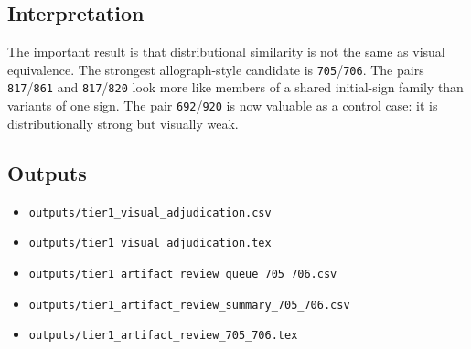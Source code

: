 \subsection{Interpretation}

The important result is that distributional similarity is not the same as visual equivalence. The strongest allograph-style candidate is \texttt{705}/\texttt{706}. The pairs \texttt{817}/\texttt{861} and \texttt{817}/\texttt{820} look more like members of a shared initial-sign family than variants of one sign. The pair \texttt{692}/\texttt{920} is now valuable as a control case: it is distributionally strong but visually weak.

\subsection{Outputs}

\begin{itemize}
  \item \texttt{outputs/tier1\_visual\_adjudication.csv}
  \item \texttt{outputs/tier1\_visual\_adjudication.tex}
  \item \texttt{outputs/tier1\_artifact\_review\_queue\_705\_706.csv}
  \item \texttt{outputs/tier1\_artifact\_review\_summary\_705\_706.csv}
  \item \texttt{outputs/tier1\_artifact\_review\_705\_706.tex}
\end{itemize}
